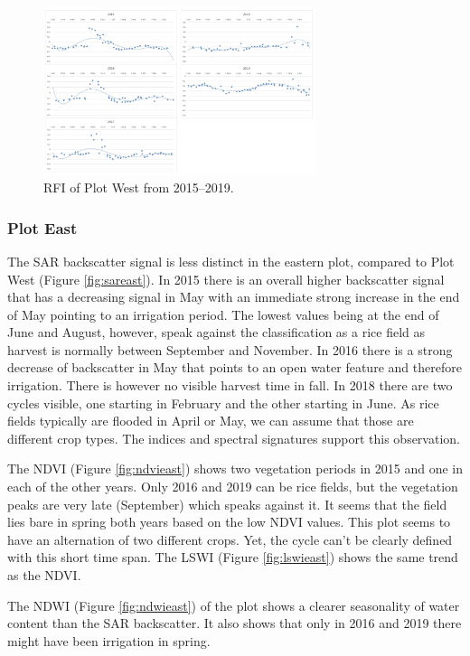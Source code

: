 \documentclass[a4paper, 10pt, conference]{ieeeconf}      %
\begin{document}
\begin{figure}[h]
\centering
\includegraphics[width=8cm]{Figures/LSWI-NDVI+0.05_west.png}
\caption{RFI of Plot West from 2015–2019.}
\label{fig:rfiwest}
\end{figure}

\subsubsection{Plot East}
The SAR backscatter signal is less distinct in the eastern plot, compared to Plot West (Figure \ref{fig:sareast}). In 2015 there is an overall higher backscatter signal that has a decreasing signal in May with an immediate strong increase in the end of May pointing to an irrigation period. The lowest values being at the end of June and August, however, speak against the classification as a rice field as harvest is normally between September and November. In 2016 there is a strong decrease of backscatter in May that points to an open water feature and therefore irrigation. There is however no visible harvest time in fall. In 2018 there are two cycles visible, one starting in February and the other starting in June. As rice fields typically are flooded in April or May, we can assume that those are different crop types. The indices and spectral signatures support this observation.

The NDVI (Figure \ref{fig:ndvieast}) shows two vegetation periods in 2015 and one in each of the other years. Only 2016 and 2019 can be rice fields, but the vegetation peaks are very late (September) which speaks against it. It seems that the field lies bare in spring both years based on the low NDVI values. This plot seems to have an alternation of two different crops. Yet, the cycle can’t be clearly defined with this short time span. The LSWI (Figure \ref{fig:lswieast}) shows the same trend as the NDVI.

The NDWI (Figure \ref{fig:ndwieast}) of the plot shows a clearer seasonality of water content than the SAR backscatter. It also shows that only in 2016 and 2019 there might have been irrigation in spring.
\end{document}
